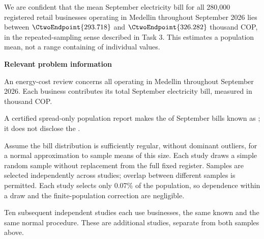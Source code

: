 We are  confident that the mean September electricity bill for all 280,000 registered retail businesses operating in Medellin throughout September 2026 lies between $\CtwoEndpoint{293.718}$ and $\CtwoEndpoint{326.282}$ thousand COP, in the repeated-sampling sense described in Task 3. This estimates a population mean, not a range containing  of individual values.

\secInicio[][sec:p1]

\clearpage



\textbf{Relevant problem information}

\begin{probleminfoexcerpt}
An energy-cost review concerns all     operating in Medellin throughout September 2026. Each business contributes its total September electricity bill, measured in thousand COP.
\end{probleminfoexcerpt}

\begin{probleminfoexcerpt}
A certified spread-only population report makes the    of September bills known as   ; it does not disclose the  .
\end{probleminfoexcerpt}

\begin{probleminfoexcerpt}
Assume the bill distribution is sufficiently regular, without dominant outliers, for a normal approximation to sample means of this size. Each study draws a simple random sample without replacement from the full fixed register. Samples are selected independently across studies; overlap between different samples is permitted. Each study selects only 0.07\% of the population, so dependence within a draw and the finite-population correction are negligible.
\end{probleminfoexcerpt}

\begin{probleminfoexcerpt}
Ten subsequent independent studies each use  businesses, the same known    and the same  normal  procedure. These are additional studies, separate from both samples above.
\end{probleminfoexcerpt}

